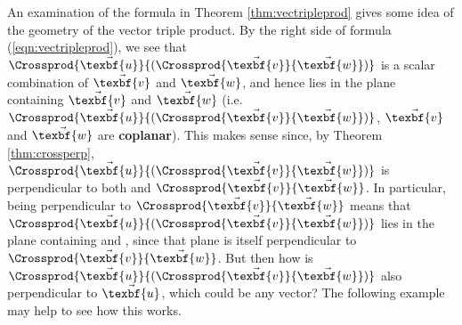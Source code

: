 An examination of the formula in Theorem \ref{thm:vectripleprod} gives some idea of the geometry of the vector triple
product. By the right side of formula (\ref{eqn:vectripleprod}), we see that
$\Crossprod{\vec{\texbf{u}}}{(\Crossprod{\vec{\texbf{v}}}{\vec{\texbf{w}}})}$ is a scalar combination of $\vec{\texbf{v}}$ and $\vec{\texbf{w}}$, and
hence lies in the plane containing $\vec{\texbf{v}}$ and $\vec{\texbf{w}}$ (i.e.
$\Crossprod{\vec{\texbf{u}}}{(\Crossprod{\vec{\texbf{v}}}{\vec{\texbf{w}}})}$, $\vec{\texbf{v}}$ and $\vec{\texbf{w}}$ are
\textbf{coplanar}).
This makes sense since, by Theorem \ref{thm:crossperp},
$\Crossprod{\vec{\texbf{u}}}{(\Crossprod{\vec{\texbf{v}}}{\vec{\texbf{w}}})}$ is perpendicular to both  and
$\Crossprod{\vec{\texbf{v}}}{\vec{\texbf{w}}}$. In particular, being perpendicular to $\Crossprod{\vec{\texbf{v}}}{\vec{\texbf{w}}}$ means
that $\Crossprod{\vec{\texbf{u}}}{(\Crossprod{\vec{\texbf{v}}}{\vec{\texbf{w}}})}$ lies in the plane containing  and
, since that plane is itself perpendicular to $\Crossprod{\vec{\texbf{v}}}{\vec{\texbf{w}}}$. But then how is
$\Crossprod{\vec{\texbf{u}}}{(\Crossprod{\vec{\texbf{v}}}{\vec{\texbf{w}}})}$ also perpendicular to $\vec{\texbf{u}}$, which could be any
vector? The following example may help to see how this works.

